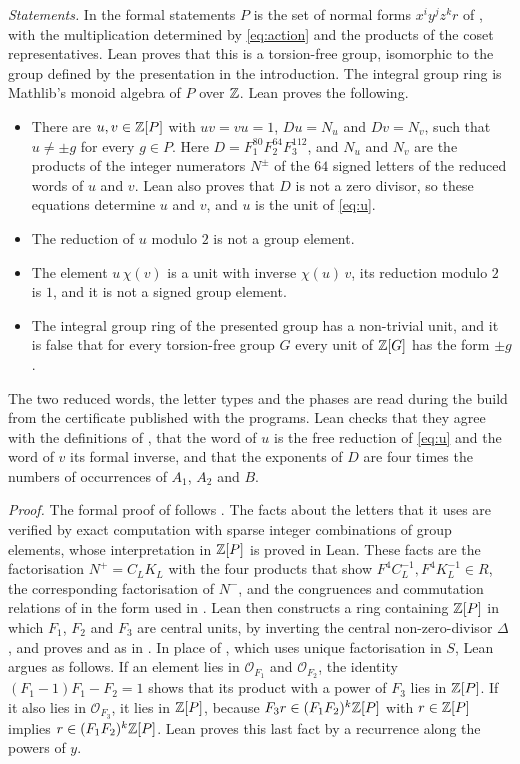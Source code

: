 \documentclass[11pt,colorlinks]{charlie}
\begin{document}
\emph{Statements.} In the formal statements $P$ is the set of normal forms $x^iy^jz^kr$ of , with the multiplication determined by \eqref{eq:action} and the products of the coset representatives. Lean proves that this is a torsion-free group, isomorphic to the group defined by the presentation in the introduction. The integral group ring is Mathlib's monoid algebra of $P$ over $\mathbb{Z}$. Lean proves the following.
\begin{itemize}\small
\item There are $u,v\in\mathbb{Z}[P]$ with $uv=vu=1$, $Du=N_u$ and $Dv=N_v$, such that $u\ne\pm g$ for every $g\in P$. Here $D=F_1^{80}F_2^{64}F_3^{112}$, and $N_u$ and $N_v$ are the products of the integer numerators $N^\pm$ of the $64$ signed letters of the reduced words of $u$ and $v$. Lean also proves that $D$ is not a zero divisor, so these equations determine $u$ and $v$, and $u$ is the unit of \eqref{eq:u}.
\item The reduction of $u$ modulo $2$ is not a group element.
\item The element $u\,\chi(v)$ is a unit with inverse $\chi(u)\,v$, its reduction modulo $2$ is $1$, and it is not a signed group element.
\item The integral group ring of the presented group has a non-trivial unit, and it is false that for every torsion-free group $G$ every unit of $\mathbb{Z}[G]$ has the form $\pm g$.
\end{itemize}
The two reduced words, the letter types and the phases are read during the build from the certificate published with the programs. Lean checks that they agree with the definitions of , that the word of $u$ is the free reduction of \eqref{eq:u} and the word of $v$ its formal inverse, and that the exponents of $D$ are four times the numbers of occurrences of $A_1$, $A_2$ and $B$.

\emph{Proof.} The formal proof of  follows . The facts about the letters that it uses are verified by exact computation with sparse integer combinations of group elements, whose interpretation in $\mathbb{Z}[P]$ is proved in Lean. These facts are the factorisation $N^+=C_LK_L$ with the four products that show $F^4C_L^{-1},F^4K_L^{-1}\in R$, the corresponding factorisation of $N^-$, and the congruences and commutation relations of  in the form used in . Lean then constructs a ring containing $\mathbb{Z}[P]$ in which $F_1$, $F_2$ and $F_3$ are central units, by inverting the central non-zero-divisor $\Delta$, and proves  and  as in . In place of , which uses unique factorisation in $S$, Lean argues as follows. If an element lies in $\mathcal O_{F_1}$ and $\mathcal O_{F_2}$, the identity $(F_1-1)F_1-F_2=1$ shows that its product with a power of $F_3$ lies in $\mathbb{Z}[P]$. If it also lies in $\mathcal O_{F_3}$, it lies in $\mathbb{Z}[P]$, because $F_3r\in(F_1F_2)^k\mathbb{Z}[P]$ with $r\in\mathbb{Z}[P]$ implies $r\in(F_1F_2)^k\mathbb{Z}[P]$. Lean proves this last fact by a recurrence along the powers of $y$.
\end{document}
